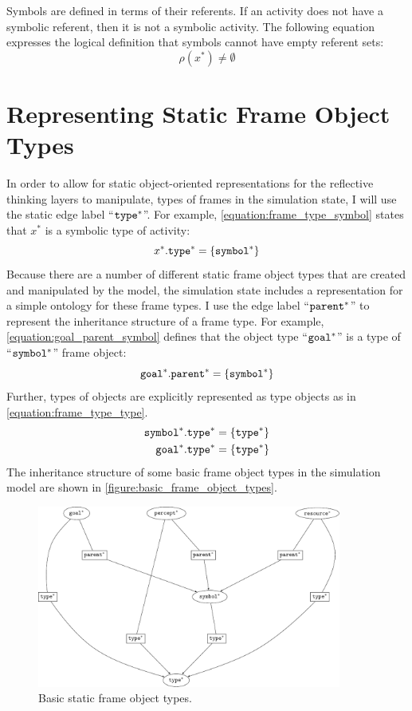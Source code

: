 Symbols are defined in terms of their referents.  If an activity does
not have a symbolic referent, then it is not a symbolic activity.  The
following equation expresses the logical definition that symbols
cannot have empty referent sets:
\begin{equation*}
\rho(x^*) \neq \emptyset
\end{equation*}

\section{Representing Static Frame Object Types}

In order to allow for static object-oriented representations for the
reflective thinking layers to manipulate, types of frames in the
simulation state, I will use the static edge label
``$\text{\tt{type}}^*$''.  For example,
{\mbox{\autoref{equation:frame_type_symbol}}} states that $x^*$ is a
symbolic type of activity:
\begin{equation}
\label{equation:frame_type_symbol}
x^*.\text{\tt{type}}^* = \{\text{\tt{symbol}}^*\}
\end{equation}
Because there are a number of different static frame object types that
are created and manipulated by the model, the simulation state
includes a representation for a simple ontology for these frame types.
I use the edge label ``$\text{\tt{parent}}^*$'' to represent the
inheritance structure of a frame type.  For example,
{\mbox{\autoref{equation:goal_parent_symbol}}} defines that the object
type ``$\text{\tt{goal}}^*$'' is a type of ``$\text{\tt{symbol}}^*$''
frame object:
\begin{equation}
\label{equation:goal_parent_symbol}
  \text{\tt{goal}}^*.\text{\tt{parent}}^* = \{\text{\tt{symbol}}^*\}
\end{equation}
Further, types of objects are explicitly represented as type objects
as in {\mbox{\autoref{equation:frame_type_type}}}.
\begin{align}
\label{equation:frame_type_type}
  \text{\tt{symbol}}^*.\text{\tt{type}}^* &= \{\text{\tt{type}}^*\} \\
    \text{\tt{goal}}^*.\text{\tt{type}}^* &= \{\text{\tt{type}}^*\}
\end{align}
The inheritance structure of some basic frame object types in the
simulation model are shown in
{\mbox{\autoref{figure:basic_frame_object_types}}}.
\begin{figure}
\includegraphics[width=10cm]{gfx/basic_frame_object_types}
\caption{Basic static frame object types.}
\label{figure:basic_frame_object_types}
\end{figure}

